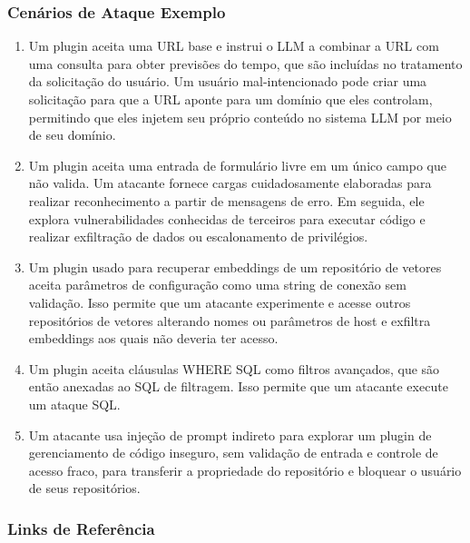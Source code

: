 \documentclass[
]{article}
\providecommand{\tightlist}{%
  \setlength{\itemsep}{0pt}\setlength{\parskip}{0pt}}
\begin{document}
\subsubsection{Cenários de Ataque
Exemplo}\label{cenuxe1rios-de-ataque-exemplo}

\begin{enumerate}
\def\labelenumi{\arabic{enumi}.}
\tightlist
\item
  Um plugin aceita uma URL base e instrui o LLM a combinar a URL com uma
  consulta para obter previsões do tempo, que são incluídas no
  tratamento da solicitação do usuário. Um usuário mal-intencionado pode
  criar uma solicitação para que a URL aponte para um domínio que eles
  controlam, permitindo que eles injetem seu próprio conteúdo no sistema
  LLM por meio de seu domínio.
\item
  Um plugin aceita uma entrada de formulário livre em um único campo que
  não valida. Um atacante fornece cargas cuidadosamente elaboradas para
  realizar reconhecimento a partir de mensagens de erro. Em seguida, ele
  explora vulnerabilidades conhecidas de terceiros para executar código
  e realizar exfiltração de dados ou escalonamento de privilégios.
\item
  Um plugin usado para recuperar embeddings de um repositório de vetores
  aceita parâmetros de configuração como uma string de conexão sem
  validação. Isso permite que um atacante experimente e acesse outros
  repositórios de vetores alterando nomes ou parâmetros de host e
  exfiltra embeddings aos quais não deveria ter acesso.
\item
  Um plugin aceita cláusulas WHERE SQL como filtros avançados, que são
  então anexadas ao SQL de filtragem. Isso permite que um atacante
  execute um ataque SQL.
\item
  Um atacante usa injeção de prompt indireto para explorar um plugin de
  gerenciamento de código inseguro, sem validação de entrada e controle
  de acesso fraco, para transferir a propriedade do repositório e
  bloquear o usuário de seus repositórios.
\end{enumerate}

\subsubsection{Links de Referência}\label{links-de-referuxeancia}
\end{document}
